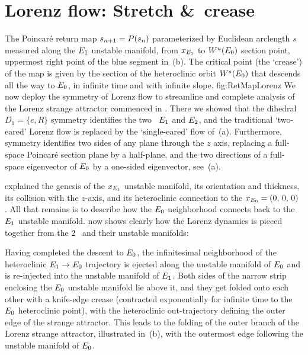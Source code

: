 \section{Lorenz flow: Stretch \&\ crease\label{exmp:LorenzRetM}}
%
{}{
The Poincar\'e return map $s_{n+1}=P(s_n)$ parameterized by
Euclidean arclength $s$ measured along the
$E_{1}$ unstable manifold,
from $x_{E_{1}}$ to  $W^u(E_{0})$ section point,
uppermost right point of the blue segment in
\,(b).
The critical point (the `crease') of the map is given by
the section of the heteroclinic orbit $W^s(E_{0})$
that descends all the way to
$E_{0}$, in infinite time and with infinite slope.
}{fig:RetMapLorenz}
%
We now deploy the symmetry of Lorenz flow
to streamline and complete analysis of the Lorenz strange attractor
commenced in  . There we showed that
the dihedral $D_1 = \{e,R\}$ symmetry identifies the
two \eqva\ $E_{1}$ and $E_{2}$,
and the traditional `two-eared' Lorenz flow
 is replaced by
the `single-eared' flow
of \,(a).
Furthermore, symmetry identifies two sides of any plane
through the $z$ axis, replacing a full-space Poincar\'e
section plane by a half-plane, and the two directions
of a full-space eigen\-vector of $E_{0}$
 by a one-sided eigen\-vector, see \,(a).

 explained the genesis of the
$x_{E_{1}}$ {\eqv} unstable manifold, its orientation and
thickness, its collision with the $z$-axis, and its
heteroclinic connection to the $x_{E_{0}} = (0,\, 0,\, 0)$
{\eqv}. All that remains is to describe how the $E_{0}$
neighborhood connects back to the $E_{1}$ unstable
manifold.  now shows clearly how the
Lorenz dynamics is pieced together from the 2 \eqva\ and their
unstable manifolds:

Having completed the descent to  $E_{0}$, the
infinitesimal neighborhood of the heteroclinic $E_{1} \to
E_{0}$ trajectory is ejected along the unstable manifold
of $E_{0}$ and is re-injected into the unstable manifold
of $E_{1}$. Both sides of the narrow strip enclosing the
$E_{0}$ unstable manifold  lie above it, and they get
folded onto each other with a knife-edge crease (contracted
exponentially for infinite time to the  $E_{0}$
heteroclinic point), with the heteroclinic out-trajectory
defining the outer edge of the strange attractor. This leads to
the folding of the outer branch of the Lorenz strange
attractor, illustrated in \,(b), with
the outermost edge following the unstable manifold of
$E_{0}$.


